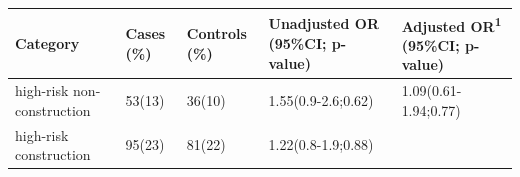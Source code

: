 \documentclass[
]{article}
\begin{document}
\begin{longtable}[]{@{}lllll@{}}
\toprule
\begin{minipage}[b]{0.20\columnwidth}\raggedright
Category\strut
\end{minipage} & \begin{minipage}[b]{0.08\columnwidth}\raggedright
Cases (\%)\strut
\end{minipage} & \begin{minipage}[b]{0.10\columnwidth}\raggedright
Controls (\%)\strut
\end{minipage} & \begin{minipage}[b]{0.24\columnwidth}\raggedright
Unadjusted OR (95\%CI; p-value)\strut
\end{minipage} & \begin{minipage}[b]{0.23\columnwidth}\raggedright
Adjusted OR\textsuperscript{1} (95\%CI; p-value)\strut
\end{minipage}\tabularnewline
\midrule
\endhead
\begin{minipage}[t]{0.20\columnwidth}\raggedright
high-risk non-construction\strut
\end{minipage} & \begin{minipage}[t]{0.08\columnwidth}\raggedright
53(13)\strut
\end{minipage} & \begin{minipage}[t]{0.10\columnwidth}\raggedright
36(10)\strut
\end{minipage} & \begin{minipage}[t]{0.24\columnwidth}\raggedright
1.55(0.9-2.6;0.62)\strut
\end{minipage} & \begin{minipage}[t]{0.23\columnwidth}\raggedright
1.09(0.61-1.94;0.77)\strut
\end{minipage}\tabularnewline
\begin{minipage}[t]{0.20\columnwidth}\raggedright
high-risk construction\strut
\end{minipage} & \begin{minipage}[t]{0.08\columnwidth}\raggedright
95(23)\strut
\end{minipage} & \begin{minipage}[t]{0.10\columnwidth}\raggedright
81(22)\strut
\end{minipage} & \begin{minipage}[t]{0.24\columnwidth}\raggedright
1.22(0.8-1.9;0.88)\strut
\end{minipage} & \begin{minipage}[t]{0.23\columnwidth}\raggedright

\end{minipage}
\end{longtable}
\end{document}
